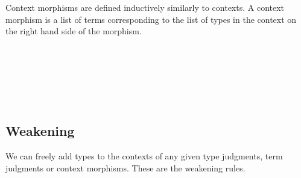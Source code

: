 \documentclass{sig-alternate}
\begin{document}
\begin{code}\>\<%
\\
\> \AgdaSymbol{:}   \AgdaSymbol{\}}      \AgdaSymbol{(} \AgdaSymbol{:}   \AgdaSymbol{)}     \<[47]%
\>[47]\<%
\\
\>\<\end{code}
Context morphisms are defined inductively similarly to contexts. A context morphism is a list of terms corresponding to the list of types in the context on the right hand side of the morphism.

\begin{code}\>\<%
\\
\>  \<%
\\
\>[0]\<[2]%
\>[2] \<[7]%
\>[7]\AgdaSymbol{:} \AgdaSymbol{\}}    \<%
\\
\>[0]\<[2]%
\>[2]\AgdaInductiveConstructor{\_,\_} \<[7]%
\>[7]\AgdaSymbol{:}  \AgdaSymbol{\}(} \AgdaSymbol{:}   \AgdaSymbol{)\{} \AgdaSymbol{:}  \AgdaSymbol{\}(} \AgdaSymbol{:}  \AgdaSymbol{(} \AgdaFunction{[}  \AgdaFunction{]T}\AgdaSymbol{))}\<%
\\
\>[2]\<[7]%
\>[7]   \AgdaSymbol{(} \AgdaInductiveConstructor{,} \AgdaSymbol{)}\<%
\\
\>\<\end{code}

\subsection{Weakening}

We can freely add types to the contexts of any given type judgments,
term judgments or context morphisms. These are the weakening rules.
\end{document}
